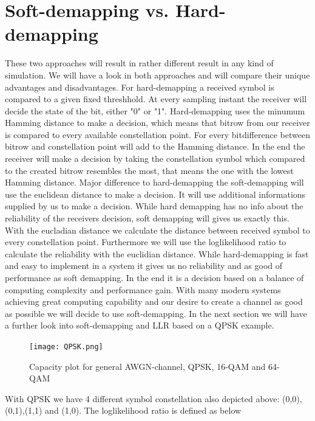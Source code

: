 \documentclass[12pt,oneside, reqno]{report}
\begin{document}
\section{Soft-demapping vs. Hard-demapping}

These two approaches will result in rather different result in any kind of simulation. We will have a look in both approaches and will compare their unique advantages and disadvantages.
For hard-demapping a received symbol is compared to a given fixed threshhold. At every sampling instant the receiver will decide the state of the bit, either "0" or "1". Hard-demapping uses the minumum Hamming distance to make a decision, which means that bitrow from our receiver is compared to every available constellation point. For every bitdifference between bitrow and constellation point will add to the Hamming distance. In the end the receiver will make a decision by taking the constellation symbol which compared to the created bitrow resembles the most, that means the one with the lowest Hamming distance.
\newline
Major difference to hard-demapping the soft-demapping will use the euclidean distance to make a decision. It will use additional informations supplied by us to make a decision. While hard demapping has no info about the reliability of the receivers decision, soft demapping will gives us exactly this. With the eucladian distance we calculate the distance between received symbol to every constellation point. Furthermore we will use the loglikelihood ratio to calculate the reliability with the euclidian distance.
While hard-demapping is fast and easy to implement in a system it gives us no reliability and as good of performance as soft demapping. In the end it is a decision based on a balance of computing complexity and performance gain.
With many modern systems achieving great computing capability and our desire to create a channel as good as possible we will decide to use soft-demapping. In the next section we will have a further look into soft-demapping and LLR based on a QPSK example.

\begin{figure}[H]
	\centering
	\texttt{[image: QPSK.png]}
	\caption{Capacity plot for general AWGN-channel, QPSK, 16-QAM and 64-QAM}
	\label{fig:Modulation}
\end{figure}
 
With QPSK we have 4 different symbol constellation also depicted above: (0,0),(0,1),(1,1) and (1,0). The loglikelihood ratio is defined as below
\end{document}
